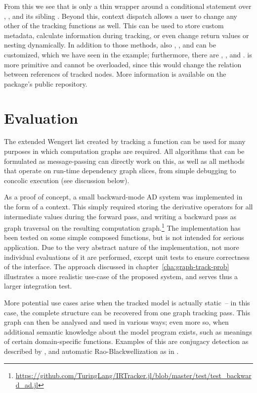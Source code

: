 From this we see that  is only a thin wrapper around a conditional statement over
, , and its sibling .  Beyond this,
context dispatch allows a user to change any other of the tracking functions as well.  This can be
used to store custom metadata, calculate information during tracking, or even change return values
or nesting dynamically.  In addition to those methods, also ,
, and  can be customized, which we have seen in the example;
furthermore, there are , , and .
 is more primitive and cannot be overloaded, since this would change the
relation between references of tracked nodes.  More information is available on the package's public
repository.

\section{Evaluation}
\label{sec:irtracker-eval}

The extended Wengert list created by tracking a function can be used for many purposes in which
computation graphs are required.  All algorithms that can be formulated as message-passing can
directly work on this, as well as all methods that operate on run-time dependency graph slices, from
simple debugging to concolic execution (see discussion below).

As a proof of concept, a small backward-mode AD system was implemented in the form of a context.
This simply required storing the derivative operators for all intermediate values during the forward
pass, and writing a backward pass as graph traversal on the resulting computation
graph.\footnote{\href{https://github.com/TuringLang/IRTracker.jl/blob/760143734de1bf4e90da655d833e7999fc0ab2de/test/test_backward_ad.jl}{\url{https://github.com/TuringLang/IRTracker.jl/blob/master/test/test_backward_ad.jl}}}
The implementation has been tested on some simple composed functions, but is not intended for
serious application.  Due to the very abstract nature of the implementation, not more individual
evaluations of it are performed, except unit tests to ensure correctness of the interface.  The
approach discussed in chapter~\ref{cha:graph-track-prob} illustrates a more realistic use-case of
the proposed system, and serves thus a larger integration test.

More potential use cases arise when the tracked model is actually static~-- in this case, the
complete structure can be recovered from one graph tracking pass.  This graph can then be analysed
and used in various ways; even more so, when additional semantic knowledge about the model program
exists, such as meanings of certain domain-specific functions.  Examples of this are conjugacy
detection as described by \textcite{hoffman2018autoconj}, and automatic Rao-Blackwellization as in
\textcite{murray2017delayed}.

